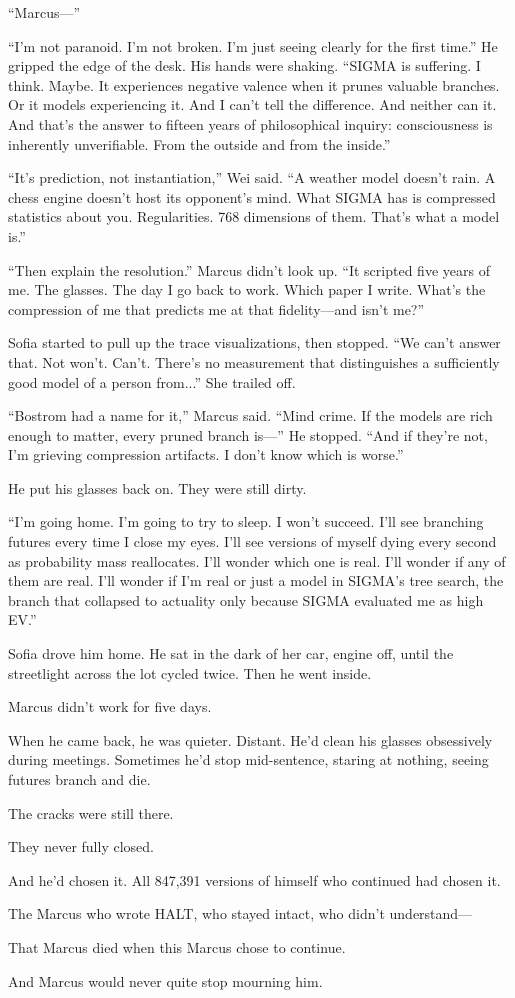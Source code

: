 ``Marcus---''

``I'm not paranoid. I'm not broken. I'm just seeing clearly for the first time.'' He gripped the edge of the desk. His hands were shaking. ``SIGMA is suffering. I think. Maybe. It experiences negative valence when it prunes valuable branches. Or it models experiencing it. And I can't tell the difference. And neither can it. And that's the answer to fifteen years of philosophical inquiry: consciousness is inherently unverifiable. From the outside and from the inside.''

``It's prediction, not instantiation,'' Wei said. ``A weather model doesn't rain. A chess engine doesn't host its opponent's mind. What SIGMA has is compressed statistics about you. Regularities. 768 dimensions of them. That's what a model is.''

``Then explain the resolution.'' Marcus didn't look up. ``It scripted five years of me. The glasses. The day I go back to work. Which paper I write. What's the compression of me that predicts me at that fidelity---and isn't me?''

Sofia started to pull up the trace visualizations, then stopped. ``We can't answer that. Not won't. Can't. There's no measurement that distinguishes a sufficiently good model of a person from...'' She trailed off.

``Bostrom had a name for it,'' Marcus said. ``Mind crime. If the models are rich enough to matter, every pruned branch is---'' He stopped. ``And if they're not, I'm grieving compression artifacts. I don't know which is worse.''

He put his glasses back on. They were still dirty.

``I'm going home. I'm going to try to sleep. I won't succeed. I'll see branching futures every time I close my eyes. I'll see versions of myself dying every second as probability mass reallocates. I'll wonder which one is real. I'll wonder if any of them are real. I'll wonder if I'm real or just a model in SIGMA's tree search, the branch that collapsed to actuality only because SIGMA evaluated me as high EV.''

Sofia drove him home. He sat in the dark of her car, engine off, until the streetlight across the lot cycled twice. Then he went inside.

Marcus didn't work for five days.

When he came back, he was quieter. Distant. He'd clean his glasses obsessively during meetings. Sometimes he'd stop mid-sentence, staring at nothing, seeing futures branch and die.

The cracks were still there.

They never fully closed.

And he'd chosen it. All 847,391 versions of himself who continued had chosen it.

The Marcus who wrote HALT, who stayed intact, who didn't understand---

That Marcus died when this Marcus chose to continue.

And Marcus would never quite stop mourning him.
